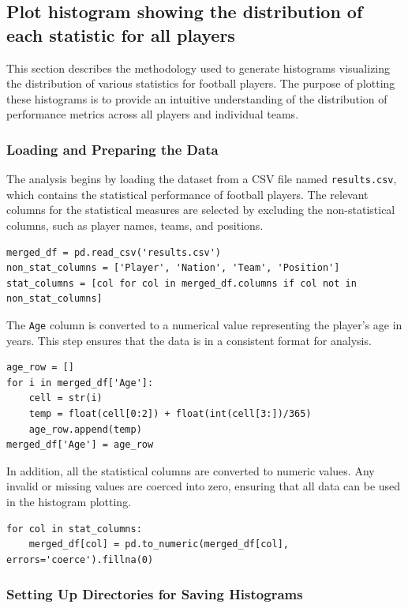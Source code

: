 \documentclass[a4paper,12pt]{article}
\begin{document}
\subsection{Plot histogram showing the distribution of each statistic for all players}
This section describes the methodology used to generate histograms visualizing the distribution of various statistics for football players. The purpose of plotting these histograms is to provide an intuitive understanding of the distribution of performance metrics across all players and individual teams.

\subsubsection{Loading and Preparing the Data}

The analysis begins by loading the dataset from a CSV file named \texttt{results.csv}, which contains the statistical performance of football players. The relevant columns for the statistical measures are selected by excluding the non-statistical columns, such as player names, teams, and positions.

\begin{verbatim}
merged_df = pd.read_csv('results.csv')
non_stat_columns = ['Player', 'Nation', 'Team', 'Position']
stat_columns = [col for col in merged_df.columns if col not in non_stat_columns]
\end{verbatim}

The \texttt{Age} column is converted to a numerical value representing the player's age in years. This step ensures that the data is in a consistent format for analysis.

\begin{verbatim}
age_row = []
for i in merged_df['Age']:
    cell = str(i)
    temp = float(cell[0:2]) + float(int(cell[3:])/365)
    age_row.append(temp)
merged_df['Age'] = age_row
\end{verbatim}

In addition, all the statistical columns are converted to numeric values. Any invalid or missing values are coerced into zero, ensuring that all data can be used in the histogram plotting.

\begin{verbatim}
for col in stat_columns:
    merged_df[col] = pd.to_numeric(merged_df[col], errors='coerce').fillna(0)
\end{verbatim}

\subsubsection{Setting Up Directories for Saving Histograms}
\end{document}
